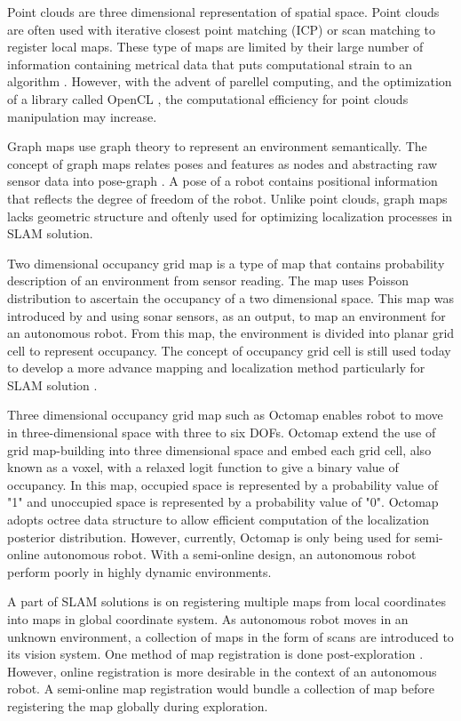 \documentclass[a4paper,10pt]{article}
\begin{document}
Point clouds are three dimensional representation of spatial space. 
Point clouds are
often used with iterative closest point matching (ICP) or scan matching to
register local maps. These type of maps are limited by their large number of
information containing metrical data that puts computational strain to an
algorithm \citep{Olson2009}. However, with the advent of parellel computing,
and the optimization of a library called OpenCL \citep{Rusu2011}, the
computational efficiency for point clouds manipulation may increase.

Graph maps use graph theory to represent an environment semantically. The
concept of graph maps relates poses and features as nodes and abstracting raw
sensor data into pose-graph \citep{Grisetti}. A pose of a robot contains
positional information that reflects the degree of freedom of the robot.
Unlike point clouds, graph
maps lacks geometric structure and oftenly used for optimizing localization
processes in SLAM solution.

Two dimensional occupancy grid map is a type of map that contains probability description of an
environment from sensor reading. The map uses Poisson distribution to ascertain
the occupancy of a two dimensional space. This map was introduced by \citet{Moravec1988} and
\citet{Elfes1989} using sonar sensors, as an output, to map an environment for
an autonomous robot. From this map, the environment is divided into planar grid
cell to represent occupancy. The concept of occupancy grid cell is still used
today to develop a more advance mapping and localization method particularly for
SLAM solution \citep{Ray,Birk}. 

Three dimensional occupancy grid map such as Octomap \citep{Hornung2013} enables
robot to move in three-dimensional space with three to six DOFs. Octomap extend
the use of grid map-building into three dimensional space and embed each grid
cell, also known as a voxel, with a relaxed logit function to give a binary
value of occupancy. In this
map, occupied space is represented by a probability value of "1" and unoccupied
space is represented by a probability value of "0". Octomap adopts octree data
structure to allow efficient computation of the localization posterior
distribution. However, currently, Octomap is only being used for semi-online
autonomous robot. With a semi-online design, an autonomous robot perform poorly
in highly dynamic environments. 

A part of SLAM solutions is on
registering multiple maps from local coordinates into maps in global coordinate
system. As autonomous robot moves in an unknown environment, a collection of
maps in the form of scans are introduced to its vision system. One method of
map registration is done post-exploration \citep{Burgard1999}. However, online
registration is more desirable in the context of an autonomous robot. A
semi-online map registration would bundle a collection of map before registering
the map globally during exploration. 
\end{document}
